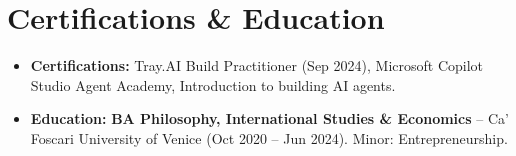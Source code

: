 \documentclass[a4paper,10pt]{article}
\begin{document}
\section{Certifications \& Education}
\begin{itemize}
 \item \textbf{Certifications:} Tray.AI Build Practitioner (Sep 2024), Microsoft Copilot Studio Agent Academy, Introduction to building AI agents.
 \item \textbf{Education:} \textbf{BA Philosophy, International Studies \& Economics} -- Ca' Foscari University of Venice (Oct 2020 -- Jun 2024). Minor: Entrepreneurship.
\end{itemize}
\end{document}
